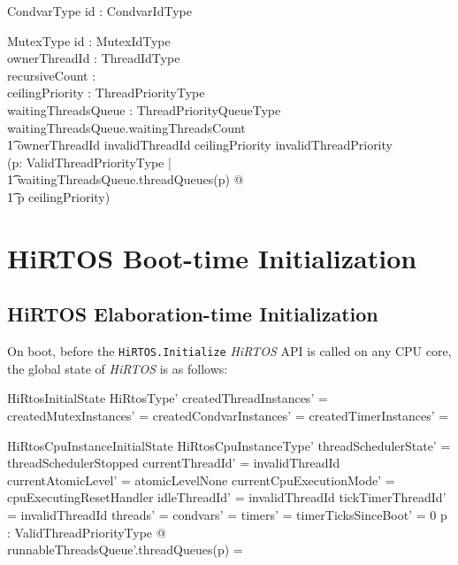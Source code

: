 \documentclass{AUJarticle}
\begin{document}
\begin{schema}{CondvarType}
   id : CondvarIdType
\end{schema}

\begin{schema}{MutexType}
   id : MutexIdType \\
   ownerThreadId : ThreadIdType \\
   recursiveCount : \nat \\
   ceilingPriority : ThreadPriorityType \\
   waitingThreadsQueue : ThreadPriorityQueueType
\where
   waitingThreadsQueue.waitingThreadsCount  \implies \\
   \t1 ownerThreadId \neq invalidThreadId
\also
   ceilingPriority \neq invalidThreadPriority \implies \\
   (\forall p: ValidThreadPriorityType | \\
   \t1     waitingThreadsQueue.threadQueues(p) \neq \emptyset @ \\
   \t1     p \leq ceilingPriority)
\end{schema}

\section{HiRTOS Boot-time Initialization}

\subsection{HiRTOS Elaboration-time Initialization}

On boot, before the \verb`HiRTOS.Initialize` \emph{HiRTOS} API is called on any CPU core,
the global state of \emph{HiRTOS} is as follows:

\begin{schema}{HiRtosInitialState}
    HiRtosType'
\where
    createdThreadInstances' =  \emptyset
\also
    createdMutexInstances' = \emptyset
\also
    createdCondvarInstances' = \emptyset
\also
    createdTimerInstances' = \emptyset
\end{schema}

\begin{schema}{HiRtosCpuInstanceInitialState}
    HiRtosCpuInstanceType'
\where
    threadSchedulerState' = threadSchedulerStopped
\also
    currentThreadId' = invalidThreadId
\also
    currentAtomicLevel' = atomicLevelNone
\also
    currentCpuExecutionMode' = cpuExecutingResetHandler
\also
    idleThreadId' = invalidThreadId
\also
    tickTimerThreadId' = invalidThreadId
\also
    threads' = \emptyset
\also
    condvars' = \emptyset
\also
    timers' = \emptyset
\also
    timerTicksSinceBoot' = 0
\also
    \forall p : ValidThreadPriorityType @ \\
	runnableThreadsQueue'.threadQueues(p) = \emptyset
\end{schema}
\end{document}
